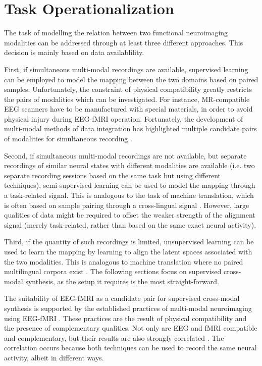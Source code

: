 \documentclass{article}
\begin{document}
\section{Task Operationalization}

The task of modelling the relation between two functional neuroimaging modalities can be addressed through at least three different approaches. This decision is mainly based on data availablility.

First, if simultaneous multi-modal recordings are available, supervised learning can be employed to model the mapping between the two domains based on paired samples. Unfortunately, the constraint of physical compatibility greatly restricts the pairs of modalities which can be investigated. For instance, MR-compatible EEG scanners have to be manufactured with special materials, in order to avoid physical injury during EEG-fMRI operation. Fortunately, the development of multi-modal methods of data integration has highlighted multiple candidate pairs of modalities for simultaneous recording \cite{yi_generative_2019}.

Second, if simultaneous multi-modal recordings are not available, but separate recordings of similar neural states with different modalities are available (i.e. two separate recording sessions based on the same task but using different techniques), semi-supervised learning can be used to model the mapping through a task-related signal. This is analogous to the task of machine translation, which is often based on sample pairing through a cross-lingual signal \cite{zhang_neural_2020}. However, large qualities of data might be required to offset the weaker strength of the alignment signal (merely task-related, rather than based on the same exact neural activity).

Third, if the quantity of such recordings is limited, unsupervised learning can be used to learn the mapping by learning to align the latent spaces associated with the two modalities. This is analogous to machine translation where no paired multilingual corpora exist \cite{lample_phrase-based_2018}. The following sections focus on supervised cross-modal synthesis, as the setup it requires is the most straight-forward.

The suitability of EEG-fMRI as a candidate pair for supervised cross-modal synthesis is supported by the established practices of multi-modal neuroimaging using EEG-fMRI \cite{huster_methods_2012}. These practices are the result of physical compatibility and the presence of complementary qualities. Not only are EEG and fMRI compatible and complementary, but their results are also strongly correlated \cite{ostwald_eeg-fmri_2009}. The correlation occurs because both techniques can be used to record the same neural activity, albeit in different ways.
\end{document}
